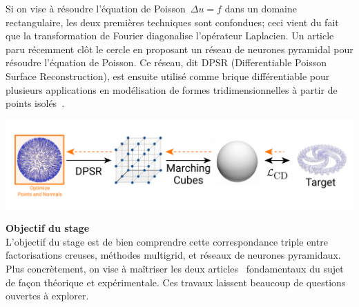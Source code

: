 \documentclass[a4paper,11pt]{article}
\begin{document}
Si on vise à résoudre l'équation de Poisson~$\Delta u = f$ dans un domaine
rectangulaire, les deux premières techniques sont confondues; ceci vient du
fait que la transformation de Fourier diagonalise l'opérateur Laplacien.
Un article~\cite{sap} paru récemment
clôt le cercle en proposant un réseau
de neurones pyramidal pour résoudre l'équation de Poisson.
Ce réseau, dit DPSR (Differentiable Poisson Surface Reconstruction), est ensuite
utilisé comme brique différentiable pour plusieurs applications en modélisation
de formes tridimensionnelles à partir de points isolés~\cite{psr}.
\\
\centerline{%
	\includegraphics[width=0.8\linewidth]{f/pipeline_optim.png}%
}



{\bf Objectif du stage}\\
L'objectif du stage est de bien comprendre cette
correspondance triple entre factorisations creuses, méthodes multigrid, et
réseaux de neurones pyramidaux.  Plus concrètement, on vise à maîtriser les
deux articles~\cite{psr,sap} fondamentaux %
du sujet de façon théorique et expérimentale.
Ces travaux laissent beaucoup de questions ouvertes à explorer.
\end{document}

